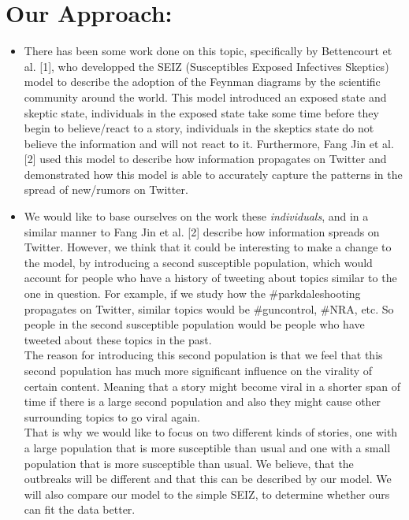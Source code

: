 \documentclass{article}
\begin{document}
\section{Our Approach:}
\begin{itemize}
\item There has been some work done on this topic, specifically by Bettencourt et al. [1], who developped the SEIZ (Susceptibles Exposed Infectives Skeptics) model to describe the adoption of the Feynman diagrams by the scientific community around the world. This model introduced an exposed state and skeptic state, individuals in the exposed state take some time before they begin to believe/react to a story, individuals in the skeptics state do not believe the information and will not react to it. Furthermore, Fang Jin et al. [2] used this model to describe how information propagates on Twitter and demonstrated how this model is able to accurately capture the patterns in the spread of new/rumors on Twitter. 
\item  We would like to base ourselves on the work these\textit{ individuals}, and in a similar manner to Fang Jin et al. [2] describe how information spreads on Twitter. However, we think that it could be interesting to make a change to the model, by introducing a second susceptible population, which would account for people who have a history of tweeting about topics similar to the one in question. For example, if we study how the \#parkdaleshooting propagates on Twitter, similar topics would be \#guncontrol, \#NRA, etc. So people in the second susceptible population would be people who have tweeted about these topics in the past. \\
The reason for introducing this second population is that we feel that this second population has much more significant influence on the virality of certain content. Meaning that a story might become viral in a shorter span of time if there is a large second population and also they might cause other surrounding topics to go viral again. 
\\That is why we would like to focus on two different kinds of stories, one with a large population that is more susceptible than usual and one with a small population that is more susceptible than usual. We believe, that the outbreaks will be different and that this can be described by our model. We will also compare our model to the simple SEIZ, to determine whether ours can fit the data better.


\end{itemize}
\end{document}
